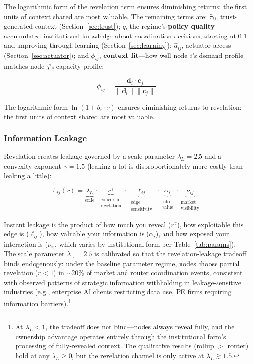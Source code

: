 \documentclass[12pt]{article}
\theoremstyle{definition}
\begin{document}
\noindent The logarithmic form of the revelation term ensures diminishing returns: the first units of context shared are most valuable. The remaining terms are: $\hat{\tau}_{ij}$, trust-generated context (Section~\ref{sec:trust}); $q$, the regime's \textbf{policy quality}---accumulated institutional knowledge about coordination decisions, starting at 0.1 and improving through learning (Section~\ref{sec:learning}); $\hat{a}_{ij}$, actuator access (Section~\ref{sec:actuator}); and $\phi_{ij}$, \textbf{context fit}---how well node $i$'s demand profile matches node $j$'s capacity profile:

\begin{equation}
\phi_{ij} = \frac{\mathbf{d}_i \cdot \mathbf{c}_j}{\|\mathbf{d}_i\| \|\mathbf{c}_j\|}
\end{equation}

The logarithmic form $\ln(1 + b_r \cdot r)$ ensures diminishing returns to revelation: the first units of context shared are most valuable.

\subsubsection{Information Leakage}
\label{sec:leakage}

Revelation creates leakage governed by a scale parameter $\lambda_L = 2.5$ and a convexity exponent $\gamma = 1.5$ (leaking a lot is disproportionately more costly than leaking a little):

\begin{equation}
\label{eq:leakage}
L_{ij}(r) = \underbrace{\lambda_L}_{\text{scale}} \cdot \underbrace{r^{\gamma}}_{\substack{\text{convex in} \\ \text{revelation}}} \cdot \underbrace{\ell_{ij}}_{\substack{\text{edge} \\ \text{sensitivity}}} \cdot \underbrace{\alpha_i}_{\substack{\text{info} \\ \text{value}}} \cdot \underbrace{\nu_{ij}}_{\substack{\text{market} \\ \text{visibility}}}
\end{equation}

\noindent Instant leakage is the product of how much you reveal ($r^\gamma$), how exploitable this edge is ($\ell_{ij}$), how valuable your information is ($\alpha_i$), and how exposed your interaction is ($\nu_{ij}$, which varies by institutional form per Table~\ref{tab:params}). The scale parameter $\lambda_L = 2.5$ is calibrated so that the revelation-leakage tradeoff binds endogenously: under the baseline parameter regime, nodes choose partial revelation ($r < 1$) in $\sim$20\% of market and router coordination events, consistent with observed patterns of strategic information withholding in leakage-sensitive industries (e.g., enterprise AI clients restricting data use, PE firms requiring information barriers).\footnote{At $\lambda_L < 1$, the tradeoff does not bind---nodes always reveal fully, and the ownership advantage operates entirely through the institutional form's processing of fully-revealed context. The qualitative results (rollup $>$ router) hold at any $\lambda_L \geq 0$, but the revelation channel is only active at $\lambda_L \gtrsim 1.5$.}
\end{document}
